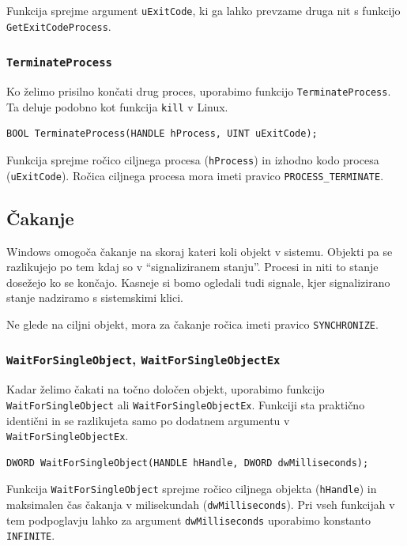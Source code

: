 \documentclass[a4paper,12pt,openright]{book}
\begin{document}
Funkcija sprejme argument \texttt{uExitCode}, ki ga lahko prevzame druga nit s funkcijo \texttt{GetExitCodeProcess}.

\subsubsection{\texttt{TerminateProcess}}

Ko želimo prisilno končati drug proces, uporabimo funkcijo \texttt{TerminateProcess}.
Ta deluje podobno kot funkcija \texttt{kill} v Linux.

\begin{lstlisting}[style=func]
 BOOL TerminateProcess(HANDLE hProcess, UINT uExitCode);
\end{lstlisting}

Funkcija sprejme ročico ciljnega procesa (\texttt{hProcess}) in izhodno kodo procesa (\texttt{uExitCode}).
Ročica ciljnega procesa mora imeti pravico \texttt{PROCESS\_TERMINATE}.

\subsection{Čakanje} \label{ssec:windows_syscalls:waiting}

Windows omogoča čakanje na skoraj kateri koli objekt v sistemu.
Objekti pa se razlikujejo po tem kdaj so v ``signaliziranem stanju''.
Procesi in niti to stanje dosežejo ko se končajo.
Kasneje si bomo ogledali tudi signale, kjer signalizirano stanje nadziramo s sistemskimi klici.

Ne glede na ciljni objekt, mora za čakanje ročica imeti pravico \texttt{SYNCHRONIZE}.

\subsubsection{\texttt{WaitForSingleObject}, \texttt{WaitForSingleObjectEx}}

Kadar želimo čakati na točno določen objekt, uporabimo funkcijo \texttt{WaitForSingleObject} ali \texttt{WaitForSingleObjectEx}.
Funkciji sta praktično identični in se razlikujeta samo po dodatnem argumentu v \texttt{WaitForSingleObjectEx}.

\begin{lstlisting}[style=func]
 DWORD WaitForSingleObject(HANDLE hHandle, DWORD dwMilliseconds);
\end{lstlisting}

Funkcija \texttt{WaitForSingleObject} sprejme ročico ciljnega objekta (\texttt{hHandle}) in maksimalen čas čakanja v milisekundah (\texttt{dwMilliseconds}).
Pri vseh funkcijah v tem podpoglavju lahko za argument \texttt{dwMilliseconds} uporabimo konstanto \texttt{INFINITE}.
\end{document}
